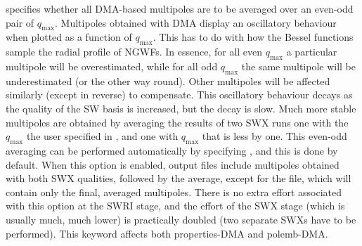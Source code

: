 \documentclass[letterpaper,10pt,english]{sphinxmanual}
\begin{document}
 \textendash{} specifies whether all DMA-based
multipoles are to be averaged over an even-odd pair of
\(q_{\textrm{max}}\). Multipoles obtained with DMA display an
oscillatory behaviour when plotted as a function of
\(q_{\textrm{max}}\). This has to do with how the Bessel functions
sample the radial profile of NGWFs. In essence, for all even
\(q_{\textrm{max}}\) a particular multipole will be overestimated,
while for all odd \(q_{\textrm{max}}\) the same multipole will be
underestimated (or the other way round). Other multipoles will be
affected similarly (except in reverse) to compensate. This oscillatory
behaviour decays as the quality of the SW basis is increased, but the
decay is slow. Much more stable multipoles are obtained by averaging the
results of two SWX runs \textendash{} one with the \(q_{\textrm{max}}\) the user
specified in , and one with \(q_{\textrm{max}}\) that
is less by one. This even-odd averaging can be performed automatically
by specifying , and this is done by default.
When this option is enabled, output files include multipoles obtained
with both SWX qualities, followed by the average, except for the
 file, which will contain only the
final, averaged multipoles. There is no extra effort associated with
this option at the SWRI stage, and the effort of the SWX stage (which is
usually much, much lower) is practically doubled (two separate SWXs have
to be performed). This keyword affects both properties-DMA and
polemb-DMA.
\end{document}

